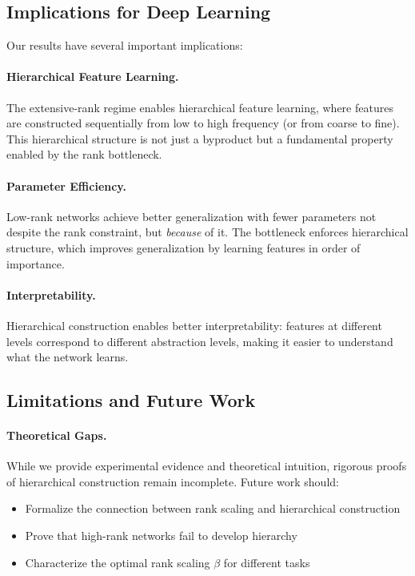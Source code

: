 \subsection{Implications for Deep Learning}

Our results have several important implications:

\paragraph{Hierarchical Feature Learning.}
The extensive-rank regime enables hierarchical feature learning, where features are constructed sequentially from low to high frequency (or from coarse to fine). This hierarchical structure is not just a byproduct but a fundamental property enabled by the rank bottleneck.

\paragraph{Parameter Efficiency.}
Low-rank networks achieve better generalization with fewer parameters not despite the rank constraint, but \emph{because} of it. The bottleneck enforces hierarchical structure, which improves generalization by learning features in order of importance.

\paragraph{Interpretability.}
Hierarchical construction enables better interpretability: features at different levels correspond to different abstraction levels, making it easier to understand what the network learns.

\subsection{Limitations and Future Work}

\paragraph{Theoretical Gaps.}
While we provide experimental evidence and theoretical intuition, rigorous proofs of hierarchical construction remain incomplete. Future work should:
\begin{itemize}
    \item Formalize the connection between rank scaling and hierarchical construction
    \item Prove that high-rank networks fail to develop hierarchy
    \item Characterize the optimal rank scaling $\beta$ for different tasks
\end{itemize}

